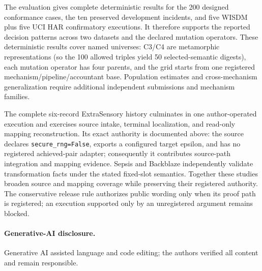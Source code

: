 \documentclass[letterpaper]{article} %
\begin{document}
The evaluation gives complete deterministic results for the 200 designed
conformance cases, the ten preserved development incidents, and five WISDM
plus five UCI HAR confirmatory executions.  It therefore supports the reported
decision patterns across two datasets and the declared mutation operators.
These deterministic results cover named universes: C3/C4 are metamorphic
representations (so the 100 allowed triples yield 50 selected-semantic
digests), each mutation operator has four parents, and the grid starts from one
registered mechanism/pipeline/accountant base.  Population estimates and
cross-mechanism generalization require additional independent submissions and
mechanism families.

The complete six-record ExtraSensory history culminates in one
author-operated execution and exercises source intake, terminal localization,
and read-only mapping reconstruction.  Its exact authority is documented
above: the source declares \texttt{secure\_rng=False}, exports a configured
target epsilon, and has no registered achieved-pair adapter; consequently it
contributes source-path integration and mapping evidence.  Sepsis and
Backblaze independently validate transformation facts under the stated
fixed-slot semantics.  Together these studies broaden source and mapping
coverage while preserving their registered authority.  The conservative
release rule authorizes public wording only when its proof path is registered;
an execution supported only by an unregistered argument remains blocked.

\paragraph{Generative-AI disclosure.}
Generative AI assisted language and code editing; the authors verified all
content and remain responsible.


\end{document}
